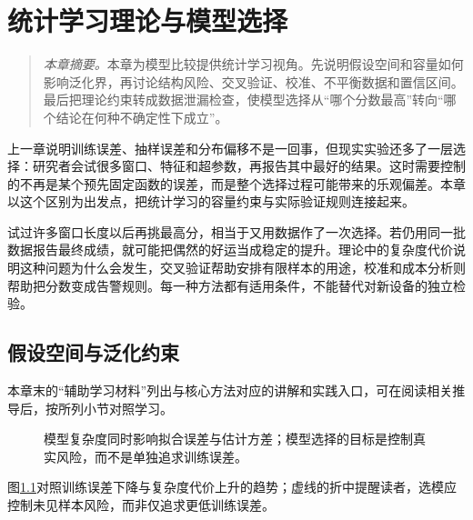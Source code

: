 ﻿\chapter{统计学习理论与模型选择}

\begin{quote}\small
\textit{本章摘要。}本章为模型比较提供统计学习视角。先说明假设空间和容量如何影响泛化界，再讨论结构风险、交叉验证、校准、不平衡数据和置信区间。最后把理论约束转成数据泄漏检查，使模型选择从“哪个分数最高”转向“哪个结论在何种不确定性下成立”。
\end{quote}

上一章说明训练误差、抽样误差和分布偏移不是一回事，但现实实验还多了一层选择：研究者会试很多窗口、特征和超参数，再报告其中最好的结果。这时需要控制的不再是某个预先固定函数的误差，而是整个选择过程可能带来的乐观偏差。本章以这个区别为出发点，把统计学习的容量约束与实际验证规则连接起来。

试过许多窗口长度以后再挑最高分，相当于又用数据作了一次选择。若仍用同一批数据报告最终成绩，就可能把偶然的好运当成稳定的提升。理论中的复杂度代价说明这种问题为什么会发生，交叉验证帮助安排有限样本的用途，校准和成本分析则帮助把分数变成告警规则。每一种方法都有适用条件，不能替代对新设备的独立检验。

\section{假设空间与泛化约束}

本章末的“辅助学习材料”列出与核心方法对应的讲解和实践入口，可在阅读相关推导后，按所列小节对照学习。

\begin{figure}[htbp]
\centering
{}
\caption{模型复杂度同时影响拟合误差与估计方差；模型选择的目标是控制真实风险，而不是单独追求训练误差。}
\label{fig:statistical-complexity-tradeoff}
\end{figure}
图\ref{fig:statistical-complexity-tradeoff}对照训练误差下降与复杂度代价上升的趋势；虚线的折中提醒读者，选模应控制未见样本风险，而非仅追求更低训练误差。
